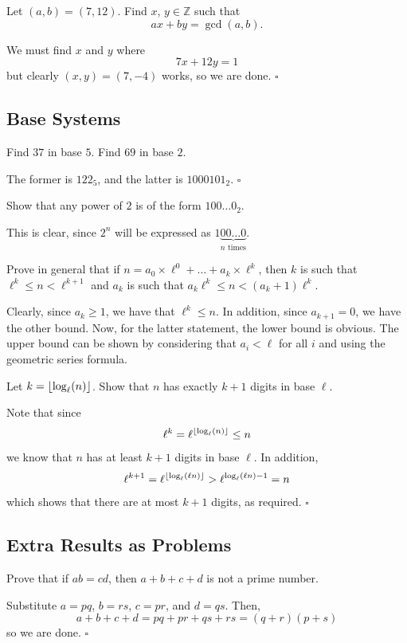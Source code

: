 \documentclass{article}
\begin{document}
\begin{problem}[1.8.3]{}
Let $(a, b) = (7, 12)$. Find $x$, $y \in \mathbb{Z}$ such that \[ax + by = \gcd(a, b).\]
\end{problem}
We must find $x$ and $y$ where \[7x+12y = 1\] but clearly $(x, y) = (7, -4)$ works, so we are done. $\square$
\subsection{Base Systems}

\begin{problem}[1.9.1]{}
Find $37$ in base $5$. Find $69$ in base $2$.
\end{problem}
The former is $122_5$, and the latter is $1000101_2$. $\square$

\begin{problem}[1.9.2]{}
Show that any power of $2$ is of the form $100\dots0_2$.
\end{problem}
This is clear, since $2^n$ will be expressed as $1\underbrace{00\dots0}_{n\text{ times}}$.

\begin{problem}[1.9.3]{}
Prove in general that if $n = a_0 \times \ell^0 + \dots + a_k \times \ell^k$, then $k$ is such that $\ell^k \le n < \ell^{k+1}$ and $a_k$ is such that $a_k\ell^k \le n < (a_k + 1)\ell^k$.
\end{problem}
Clearly, since $a_k \ge 1$, we have that $\ell^k \le n$. In addition, since $a_{k+1} = 0$, we have the other bound. Now, for the latter statement, the lower bound is obvious. The upper bound can be shown by considering that $a_i < \ell$ for all $i$ and using the geometric series formula.

\begin{problem}[1.9.4]{}
Let $k = \left\lfloor \log_\ell(n) \right\rfloor$. Show that $n$ has exactly $k+1$ digits in base $\ell$.
\end{problem}
Note that since \[\ell^k = \ell^{\left\lfloor \log_\ell(n) \right\rfloor} \le n\] we know that $n$ has at least $k+1$ digits in base $\ell$. In addition, \[\ell^{k+1} = \ell^{\left\lfloor \log_\ell(\ell n) \right\rfloor} > \ell^{\log_\ell(\ell n)-1} = n\] which shows that there are at most $k+1$ digits, as required. $\square$

\subsection{Extra Results as Problems}

\begin{problem}[1.10.1]{}
Prove that if $ab = cd$, then $a + b + c + d$ is not a prime number.
\end{problem}
Substitute $a = pq$, $b = rs$, $c = pr$, and $d = qs$. Then, \[a+b+c+d = pq+pr+qs+rs = (q+r)(p+s)\] so we are done. $\square$
\end{document}
